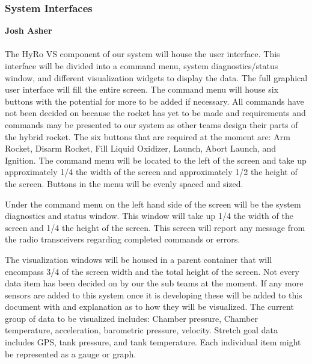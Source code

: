 \documentclass[10pt,draftclsnofoot,onecolumn,compsoc]{IEEEtran}
\begin{document}
\subsubsection{System Interfaces}
{\bf Josh Asher }
\\ \\
The HyRo VS component of our system will house the user interface. This interface will be divided into a command menu, system diagnostics/status window, and different visualization widgets to display the data. The full graphical user interface will fill the entire screen. The command menu will house six buttons with the potential for more to be added if necessary. All commands have not been decided on because the rocket has yet to be made and requirements and commands may be presented to our system as other teams design their parts of the hybrid rocket.  The six buttons that are required at the moment are: Arm Rocket, Disarm Rocket, Fill Liquid Oxidizer, Launch, Abort Launch, and Ignition. The command menu will be located to the left of the screen and take up approximately 1/4 the width of the screen and approximately 1/2 the height of the screen. Buttons in the menu will be evenly spaced and sized. \par

	Under the command menu on the left hand side of the screen will be the system diagnostics and status window. This window will take up 1/4 the width of the screen and 1/4 the height of the screen. This screen will report any message from the radio transceivers regarding completed commands or errors.\par
 
	The visualization windows will be housed in a parent container that will encompass 3/4 of the screen width and the total height of the screen. Not every data item has been decided on by our the sub teams at the moment.  If any more sensors are added to this system once it is developing these will be added to this document with and explanation as to how they will be visualized.  The current group of data to be visualized includes: Chamber pressure, Chamber temperature, acceleration, barometric pressure, velocity. Stretch goal data includes GPS, tank pressure, and tank temperature.   Each individual item might be represented as a gauge or graph.\par
\end{document}
